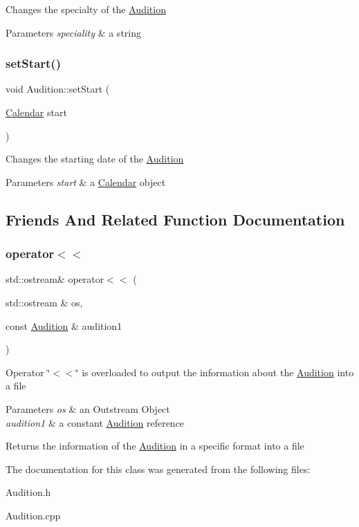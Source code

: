 Changes the specialty of the \hyperlink{class_audition}{Audition} 
\begin{DoxyParams}{Parameters}
{\em speciality} & a string \\
\hline
\end{DoxyParams}
\mbox{\label{class_audition_a65f617b37f5a3a65f37ad68e8a293e15}} 
\subsubsection{\texorpdfstring{set\+Start()}{setStart()}}
{\footnotesize\ttfamily void Audition\+::set\+Start (\begin{DoxyParamCaption}\item[{\hyperlink{class_calendar}{Calendar}}]{start }\end{DoxyParamCaption})}

Changes the starting date of the \hyperlink{class_audition}{Audition} 
\begin{DoxyParams}{Parameters}
{\em start} & a \hyperlink{class_calendar}{Calendar} object \\
\hline
\end{DoxyParams}


\subsection{Friends And Related Function Documentation}
\mbox{\label{class_audition_a67ea98e4a54230ec3836fea39695ff8d}} 
\subsubsection{\texorpdfstring{operator$<$$<$}{operator<<}}
{\footnotesize\ttfamily std\+::ostream\& operator$<$$<$ (\begin{DoxyParamCaption}\item[{std\+::ostream \&}]{os,  }\item[{const \hyperlink{class_audition}{Audition} \&}]{audition1 }\end{DoxyParamCaption})\hspace{0.3cm}{\ttfamily [friend]}}

Operator \char`\"{}$<$$<$\char`\"{} is overloaded to output the information about the \hyperlink{class_audition}{Audition} into a file 
\begin{DoxyParams}{Parameters}
{\em os} & an Outstream Object \\
\hline
{\em audition1} & a constant \hyperlink{class_audition}{Audition} reference \\
\hline
\end{DoxyParams}
\begin{DoxyReturn}{Returns}
the information of the \hyperlink{class_audition}{Audition} in a specific format into a file 
\end{DoxyReturn}


The documentation for this class was generated from the following files\+:\begin{DoxyCompactItemize}
\item 
Audition.\+h\item 
Audition.\+cpp\end{DoxyCompactItemize}
